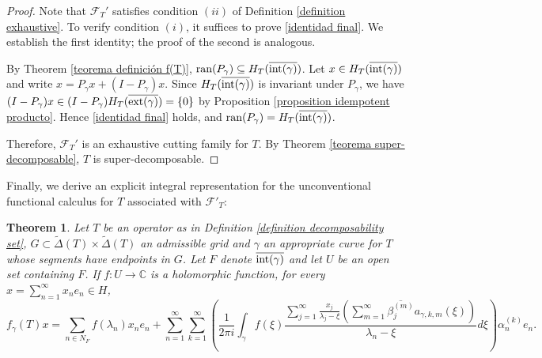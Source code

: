 \documentclass[11pt]{amsart}
\newtheorem{theorem}{Theorem}[section]
\theoremstyle{definition}
\theoremstyle{remark}
\numberwithin{equation}{section}
\newcommand{\ran}{\textnormal{ran}}
\newcommand{\F}{\mathcal{F}}
\newcommand{\al}{\alpha}
\newcommand{\Hint}{H_T(\overline{\inte(\gamma)})}
\newcommand{\Hext}{H_T(\overline{\exte(\gamma)})}
\newcommand{\sumn}{\sum_{n=1}^{\infty}}
\newcommand{\summ}{\sum_{m=1}^{\infty}}
\newcommand{\sumj}{\sum_{j=1}^\infty}
\newcommand{\inte}{\textnormal{int}}
\newcommand{\exte}{\textnormal{ext}}
\begin{document}
\begin{proof}
Note that $\F_T'$ satisfies condition $(ii)$ of Definition \ref{definition exhaustive}. To verify condition $(i)$, it suffices to prove \eqref{identidad final}. We establish the first identity; the proof of the second is analogous.

By Theorem \ref{teorema definición f(T)}, $\ran(P_\gamma)\subseteq \Hint$. Let $x\in \Hint$ and write $x=P_\gamma x+(I-P_\gamma)x$. Since $\Hint$ is invariant under $P_\gamma$, we have $(I-P_\gamma)x\in (I-P_\gamma)\Hext=\{0\}$ by Proposition \ref{proposition idempotent producto}. Hence \eqref{identidad final} holds, and $\ran(P_\gamma)=\Hint$.

Therefore, $\F_T'$ is an exhaustive cutting family for $T$. By Theorem \ref{teorema super-decomposable}, $T$ is super-decomposable.
\end{proof}

Finally, we derive an explicit integral representation for the unconventional functional calculus for $T$ associated with $\mathcal{F}'_T$:

\begin{theorem}
Let $T$ be an operator as in Definition \ref{definition decomposability set},  $G\subset \tilde{\Delta}(T)\times \tilde{\Delta}(T)$ an admissible grid and $\gamma$ an appropriate curve for $T$ whose segments have endpoints in $G$. Let $F$ denote $\overline{\inte(\gamma)}$ and let $U$ be an open set containing $F$. If $f: U \rightarrow \mathbb{C}$ is a holomorphic function, for every $x=\sumn x_ne_n \in H$,
     $$
     f_\gamma(T)x = \sum_{n\in N_F} f(\lambda_n)x_ne_n + \sumn \sum_{k=1}^\infty \left( \frac{1}{2\pi i} \int_{\gamma} f(\xi) \frac{ \sumj \frac{x_j}{\lambda_j-\xi}\left(\summ \overline{\beta_j^{(m)}}a_{\gamma,k,m}(\xi)\right)}{\lambda_n-\xi}        d\xi    \right)\al_n^{(k)}e_n.
	$$
\end{theorem}
\end{document}
